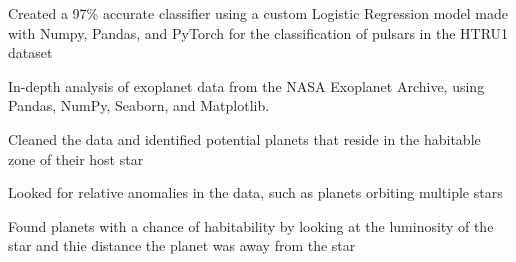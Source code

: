 \documentclass[]{resume-template}
\begin{document}
\begin{minipage}[t]{0.66\textwidth}
    \label{subsec:pulsar-identification}
    \begin{tightemize}
        \item Created a 97\% accurate classifier using a custom Logistic Regression model made with Numpy, Pandas, and PyTorch for the classification of pulsars in the HTRU1 dataset
    \end{tightemize}

    \label{subsec:exo-eda}
    \begin{tightemize}
        \item In-depth analysis of exoplanet data from the NASA Exoplanet Archive, using Pandas, NumPy,
        Seaborn, and Matplotlib.
        \item Cleaned the data and identified potential planets that reside in the habitable zone of their host star
        \item Looked for relative anomalies in the data, such as planets orbiting multiple stars
        \item Found planets with a chance of habitability by looking at the luminosity of the star and thie distance the planet was away from the star

    \end{tightemize}
    \vspace{\topsep}


\end{minipage}
\end{document}
